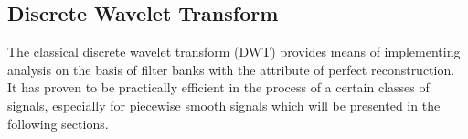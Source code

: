  \subsection{Discrete Wavelet Transform}
 The classical discrete wavelet transform (DWT) provides means of implementing analysis on the basis of filter banks with the attribute of perfect reconstruction. It has proven to be practically efficient in the process of a certain classes of signals, especially for piecewise smooth signals which will be presented in the following sections. 



